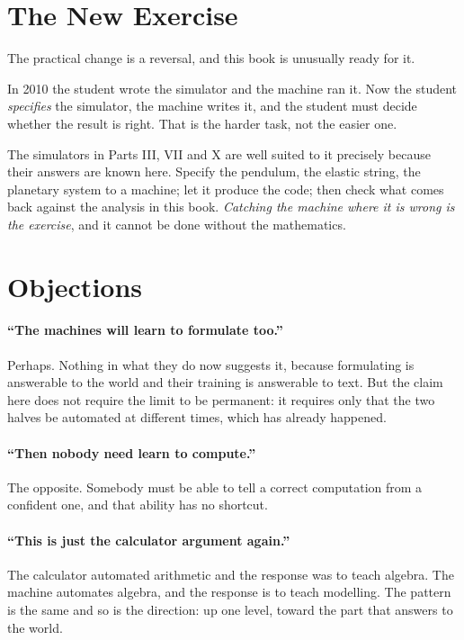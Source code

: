 \section{The New Exercise}

The practical change is a reversal, and this book is unusually ready for it.

In 2010 the student wrote the simulator and the machine ran it. Now the student \emph{specifies} the
simulator, the machine writes it, and the student must decide whether the result is right. That is
the harder task, not the easier one.

The simulators in Parts III, VII and X are well suited to it precisely because their answers are
known here. Specify the pendulum, the elastic string, the planetary system to a machine; let it
produce the code; then check what comes back against the analysis in this book. \emph{Catching the
machine where it is wrong is the exercise}, and it cannot be done without the mathematics.

\section{Objections}

\paragraph{``The machines will learn to formulate too.''} Perhaps. Nothing in what they do now
suggests it, because formulating is answerable to the world and their training is answerable to
text. But the claim here does not require the limit to be permanent: it requires only that the two
halves be automated at different times, which has already happened.

\paragraph{``Then nobody need learn to compute.''} The opposite. Somebody must be able to tell a
correct computation from a confident one, and that ability has no shortcut.

\paragraph{``This is just the calculator argument again.''} The calculator automated arithmetic and
the response was to teach algebra. The machine automates algebra, and the response is to teach
modelling. The pattern is the same and so is the direction: up one level, toward the part that
answers to the world.

